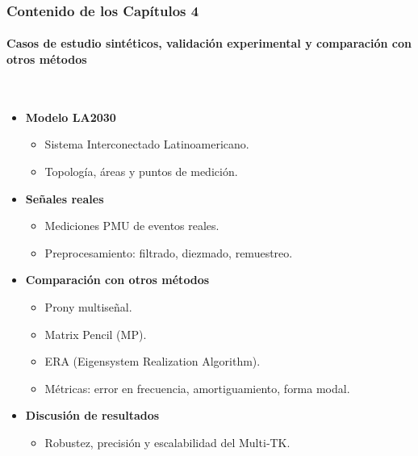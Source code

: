 \documentclass{beamer}
\begin{document}
\begin{frame}
\frametitle{Contenido de los Capítulos 4}
\framesubtitle{Casos de estudio sintéticos, validación experimental y comparación con otros métodos}



\centering
{} \\

\begin{itemize}
    \item \textbf{Modelo LA2030}
    \begin{itemize}
        \small
        \item Sistema Interconectado Latinoamericano.
        \item Topología, áreas y puntos de medición.
    \end{itemize}
    \item \textbf{Señales reales}
    \begin{itemize}
        \small
        \item Mediciones PMU de eventos reales.
        \item Preprocesamiento: filtrado, diezmado, remuestreo.
    \end{itemize}
    \item \textbf{Comparación con otros métodos}
    \begin{itemize}
        \small
        \item Prony multiseñal.
        \item Matrix Pencil (MP).
        \item ERA (Eigensystem Realization Algorithm).
        \item Métricas: error en frecuencia, amortiguamiento, forma modal.
    \end{itemize}
    \item \textbf{Discusión de resultados}
    \begin{itemize}
        \small
        \item Robustez, precisión y escalabilidad del Multi‑TK.
    \end{itemize}
\end{itemize}

\end{frame}


\ThankYouFrame
\end{document}
